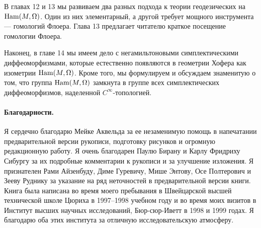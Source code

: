 В главах 12 и 13 мы развиваем два разных подхода к теории геодезических на $\mathrm{Ham}(M,\Omega)$.
Один из них элементарный, а другой требует мощного инструмента --- гомологий Флоера.
Глава 13 предлагает читателю краткое посещение гомологии Флоера.

Наконец, в главе 14 мы имеем дело с негамильтоновыми симплектическими диффеоморфизмами, которые естественно появляются в геометрии Хофера как изометрии $\mathrm{Ham}(M,\Omega)$.
Кроме того, мы формулируем и обсуждаем знаменитую  о том, что группа $\mathrm{Ham}(M,\Omega)$ замкнута в группе всех симплектических диффеоморфизмов, наделенной $C^\infty$-топологией. 

\paragraph*{Благодарности.}
Я сердечно благодарю Мейке Аквельда за ее незаменимую помощь в напечатании предварительной версии рукописи,
подготовку рисунков и огромную редакционную работу.
Я очень благодарен Паулю Бирану и Карлу Фридриху Сибургу за их подробные комментарии к рукописи и за улучшение изложения.
Я признателен Рами Айзенбуду, Диме Гуревичу, Мише Энтову, Осе Полтерович и Зееву Руднику за указание на ряд неточностей в предварительной версии книги.
Книга была написана во время моего пребывания в Швейцарской высшей технической школе Цюриха в 1997--1998 учебном году и во время моих визитов в Институт высших научных исследований, Бюр-сюр-Иветт в 1998 и 1999 годах.
Я благодарю оба этих института за отличную исследовательскую атмосферу. 
